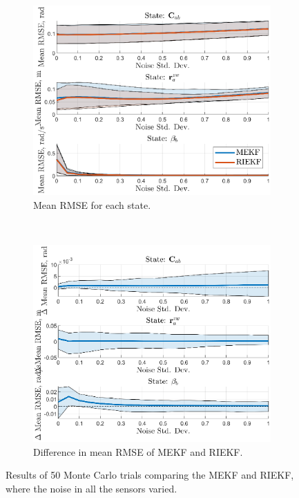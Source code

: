 \begin{figure}
	\centering
	\begin{subfigure}[b]{0.5\textwidth}
		\includegraphics[width=\textwidth]{figs/se3/bias/comp_noise_rmse_state_Bias_All_R.eps}
		\caption{Mean RMSE for each state.}
	\end{subfigure}
	~
	\begin{subfigure}[b]{0.5\textwidth}
		\includegraphics[width=\textwidth]{figs/se3/bias/comp_noise_diff_state_Bias_All_R.eps}
		\caption{Difference in mean RMSE of MEKF and RIEKF.}
	\end{subfigure}
	\caption[Results comparing the MEKF-R and RIEKF varying all sensor noise.]{Results of 50 Monte Carlo trials comparing the MEKF and RIEKF, where the noise in all the sensors varied.}
	\label{fig:se3_comp_bias_all}
\end{figure} 


